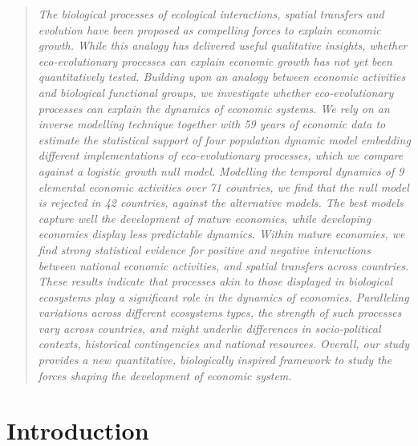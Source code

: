 \begin{quote} %
  \small{\textit{
    The biological processes of ecological interactions, spatial transfers and evolution have been proposed as compelling forces to explain economic growth. While this analogy has delivered useful qualitative insights, whether eco-evolutionary processes can explain economic growth has not yet been quantitatively tested.
    Building upon an analogy between economic activities and biological functional groups, we investigate whether eco-evolutionary processes can explain the dynamics of economic systems.
    We rely on an inverse modelling technique together with 59 years of economic data to estimate the statistical support of four population dynamic model embedding different implementations of eco-evolutionary processes, which we compare against a logistic growth null model.
    Modelling the temporal dynamics of 9 elemental economic activities over 71 countries, we find that the null model is rejected in 42 countries, against the alternative models. The best models capture well the development of mature economies, while developing economies display less predictable dynamics.
    Within mature economies, we find strong statistical evidence for positive and negative interactions between national economic activities, and spatial transfers across countries. These results indicate that processes akin to those displayed in biological ecosystems play a significant role in the dynamics of economies.
    Paralleling variations across different ecosystems types, the strength of such processes vary across countries, and might underlie differences in socio-political contexts, historical contingencies and national resources.
    Overall, our study provides a new quantitative, biologically inspired framework to study the forces shaping the development of economic system.
  }}
  \end{quote}
  \newpage

  \section{Introduction}

